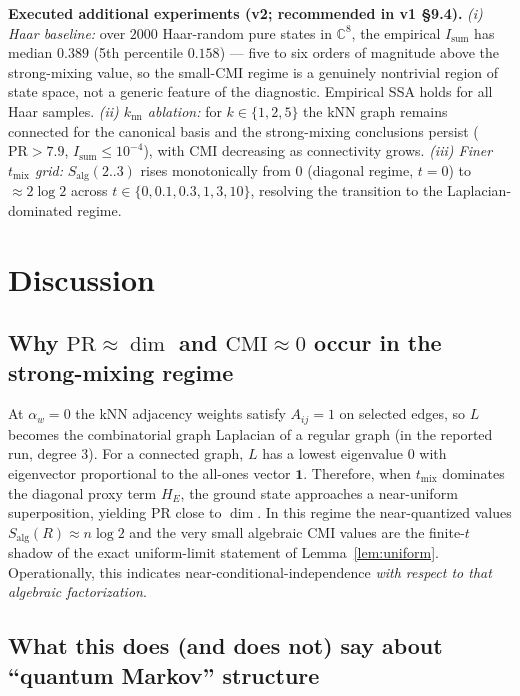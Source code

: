 \documentclass[11pt]{article}
\theoremstyle{remark}
\newcommand{\Salg}{S_{\mathrm{alg}}}
\begin{document}
\textbf{Executed additional experiments (v2; recommended in v1
\S9.4).}
\emph{(i) Haar baseline:} over $2000$ Haar-random pure states in
$\mathbb{C}^8$, the empirical $I_{\mathrm{sum}}$ has median $0.389$
(5th percentile $0.158$) --- five to six orders of magnitude above the
strong-mixing value, so the small-CMI regime is a genuinely nontrivial
region of state space, not a generic feature of the diagnostic.
Empirical SSA holds for all Haar samples. \emph{(ii) $k_{\mathrm{nn}}$
ablation:} for $k \in \{1, 2, 5\}$ the kNN graph remains connected for
the canonical basis and the strong-mixing conclusions persist
($\mathrm{PR} > 7.9$, $I_{\mathrm{sum}} \le 10^{-4}$), with CMI
decreasing as connectivity grows. \emph{(iii) Finer $t_{\mathrm{mix}}$
grid:} $\Salg(2..3)$ rises monotonically from $0$ (diagonal regime,
$t = 0$) to $\approx 2\log 2$ across $t \in \{0, 0.1, 0.3, 1, 3, 10\}$,
resolving the transition to the Laplacian-dominated regime.

\section{Discussion}

\subsection{Why $\mathrm{PR} \approx \dim$ and $\mathrm{CMI} \approx 0$
occur in the strong-mixing regime}

At $\alpha_w = 0$ the kNN adjacency weights satisfy $A_{ij} = 1$ on
selected edges, so $L$ becomes the combinatorial graph Laplacian of a
regular graph (in the reported run, degree 3). For a connected graph,
$L$ has a lowest eigenvalue $0$ with eigenvector proportional to the
all-ones vector $\mathbf{1}$. Therefore, when $t_{\mathrm{mix}}$
dominates the diagonal proxy term $H_E$, the ground state approaches a
near-uniform superposition, yielding PR close to $\dim$. In this regime
the near-quantized values $\Salg(R) \approx n\log2$ and the very small
algebraic CMI values are the finite-$t$ shadow of the exact uniform-limit
statement of Lemma~\ref{lem:uniform}. Operationally, this indicates
near-conditional-independence \emph{with respect to that algebraic
factorization}.

\subsection{What this does (and does not) say about ``quantum Markov''
structure}
\end{document}
